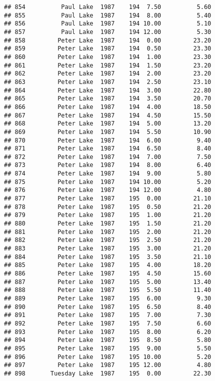\documentclass[
]{article}
\begin{document}
\begin{verbatim}
## 854          Paul Lake  1987    194  7.50          5.60
## 855          Paul Lake  1987    194  8.00          5.40
## 856          Paul Lake  1987    194 10.00          5.10
## 857          Paul Lake  1987    194 12.00          5.30
## 858         Peter Lake  1987    194  0.00         23.20
## 859         Peter Lake  1987    194  0.50         23.30
## 860         Peter Lake  1987    194  1.00         23.30
## 861         Peter Lake  1987    194  1.50         23.20
## 862         Peter Lake  1987    194  2.00         23.20
## 863         Peter Lake  1987    194  2.50         23.10
## 864         Peter Lake  1987    194  3.00         22.80
## 865         Peter Lake  1987    194  3.50         20.70
## 866         Peter Lake  1987    194  4.00         18.50
## 867         Peter Lake  1987    194  4.50         15.50
## 868         Peter Lake  1987    194  5.00         13.20
## 869         Peter Lake  1987    194  5.50         10.90
## 870         Peter Lake  1987    194  6.00          9.40
## 871         Peter Lake  1987    194  6.50          8.40
## 872         Peter Lake  1987    194  7.00          7.50
## 873         Peter Lake  1987    194  8.00          6.40
## 874         Peter Lake  1987    194  9.00          5.80
## 875         Peter Lake  1987    194 10.00          5.20
## 876         Peter Lake  1987    194 12.00          4.80
## 877         Peter Lake  1987    195  0.00         21.10
## 878         Peter Lake  1987    195  0.50         21.20
## 879         Peter Lake  1987    195  1.00         21.20
## 880         Peter Lake  1987    195  1.50         21.20
## 881         Peter Lake  1987    195  2.00         21.20
## 882         Peter Lake  1987    195  2.50         21.20
## 883         Peter Lake  1987    195  3.00         21.20
## 884         Peter Lake  1987    195  3.50         21.10
## 885         Peter Lake  1987    195  4.00         18.20
## 886         Peter Lake  1987    195  4.50         15.60
## 887         Peter Lake  1987    195  5.00         13.40
## 888         Peter Lake  1987    195  5.50         11.40
## 889         Peter Lake  1987    195  6.00          9.30
## 890         Peter Lake  1987    195  6.50          8.40
## 891         Peter Lake  1987    195  7.00          7.30
## 892         Peter Lake  1987    195  7.50          6.60
## 893         Peter Lake  1987    195  8.00          6.20
## 894         Peter Lake  1987    195  8.50          5.80
## 895         Peter Lake  1987    195  9.00          5.50
## 896         Peter Lake  1987    195 10.00          5.20
## 897         Peter Lake  1987    195 12.00          4.80
## 898       Tuesday Lake  1987    195  0.00         22.30

\end{verbatim}
\end{document}

